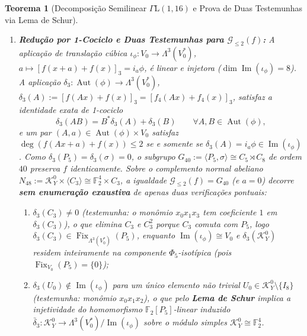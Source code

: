 \documentclass[11pt,a4paper]{article}
\newtheorem{theorem}{Teorema}[section]
\theoremstyle{definition}
\theoremstyle{remark}
\newcommand{\F}{\mathbb{F}_2}
\newcommand{\Aut}{\operatorname{Aut}}
\newcommand{\Fix}{\operatorname{Fix}}
\newcommand{\GammaL}{\Gamma\mathrm{L}}
\begin{document}
\begin{theorem}[Decomposição Semilinear $\GammaL(1,16)$ e Prova de Duas Testemunhas via Lema de Schur]
\begin{enumerate}
  \begin{equation}\label{eq:aut_semidirect}
    \Aut(\phi) = \mathcal{K}_Y^0 \rtimes (\langle C_3 \rangle \times \langle P_5 \rangle \rtimes \langle \sigma \rangle) \cong \F^4 \rtimes (C_{15} \rtimes C_8), \quad |\Aut(\phi)| = 1920,
  \end{equation}
  com relações $\sigma C_3 \sigma^{-1} = C_3^2$, $\sigma P_5 \sigma^{-1} = P_5^3$, $C_3 P_5 = P_5 C_3$ e $[C_3, \mathcal{K}_Y^0] = 1$.
  \item \textbf{Redução por 1-Cociclo e Duas Testemunhas para $\mathcal{G}_{\le 2}(f)$:} A aplicação de translação cúbica $\iota_\phi : V_0 \to \Lambda^3(V_0^*)$, $a \mapsto [f(x+a)+f(x)]_3 = i_a\phi$, é linear e injetora ($\dim\operatorname{Im}(\iota_\phi) = 8$). A aplicação $\delta_3 : \Aut(\phi) \to \Lambda^3(V_0^*)$, $\delta_3(A) := [f(Ax)+f(x)]_3 = [f_4(Ax)+f_4(x)]_3$, satisfaz a identidade exata de 1-cociclo
  \begin{equation}\label{eq:cocycle}
    \delta_3(AB) = B^*\delta_3(A) + \delta_3(B) \qquad \forall A,B \in \Aut(\phi),
  \end{equation}
  e um par $(A,a) \in \Aut(\phi) \times V_0$ satisfaz $\deg(f(Ax+a)+f(x)) \le 2$ se e somente se $\delta_3(A) = i_a\phi \in \operatorname{Im}(\iota_\phi)$. Como $\delta_3(P_5) = \delta_3(\sigma) = 0$, o subgrupo $G_{40} := \langle P_5, \sigma \rangle \cong C_5 \rtimes C_8$ de ordem $40$ preserva $f$ identicamente. Sobre o complemento normal abeliano $N_{48} := \mathcal{K}_Y^0 \times \langle C_3 \rangle \cong \F^4 \times C_3$, a igualdade $\mathcal{G}_{\le 2}(f) = G_{40}$ (e $a = 0$) decorre \textbf{sem enumeração exaustiva} de apenas duas verificações pontuais:
  \begin{enumerate}
    \item[(a)] $\delta_3(C_3) \neq 0$ (testemunha: o monômio $x_0 x_1 x_3$ tem coeficiente $1$ em $\delta_3(C_3)$), o que elimina $C_3$ e $C_3^2$ porque $C_3$ comuta com $P_5$, logo $\delta_3(C_3) \in \Fix_{\Lambda^3(V_0^*)}(P_5)$, enquanto $\operatorname{Im}(\iota_\phi) \cong V_0$ e $\delta_3(\mathcal{K}_Y^0)$ residem inteiramente na componente $\Phi_5$-isotípica (pois $\Fix_{V_0}(P_5) = \{0\}$);
    \item[(b)] $\delta_3(U_0) \notin \operatorname{Im}(\iota_\phi)$ para um único elemento não trivial $U_0 \in \mathcal{K}_Y^0 \setminus \{I_8\}$ (testemunha: monômio $x_0 x_1 x_2$), o que pelo \textbf{Lema de Schur} implica a injetividade do homomorfismo $\F[P_5]$-linear induzido $\bar{\delta}_3 : \mathcal{K}_Y^0 \to \Lambda^3(V_0^*)/\operatorname{Im}(\iota_\phi)$ sobre o módulo simples $\mathcal{K}_Y^0 \cong \F^4$.
  \end{enumerate}
\end{enumerate}
\end{theorem}
\end{document}
